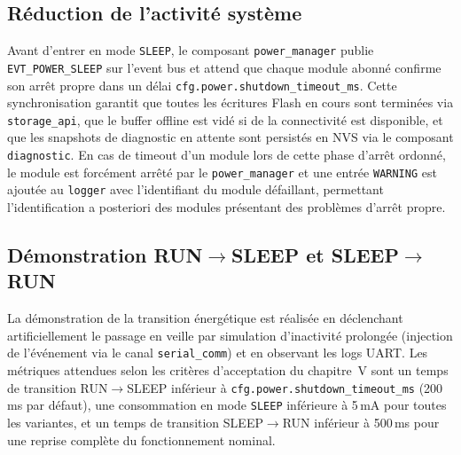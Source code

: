 \subsection{Réduction de l'activité système}
\label{subsec:power_reduce}

Avant d'entrer en mode \texttt{SLEEP}, le composant \texttt{power\_manager}
publie \texttt{EVT\_POWER\_SLEEP} sur l'event bus et attend que chaque
module abonné confirme son arrêt propre dans un délai
\texttt{cfg.power.shutdown\_timeout\_ms}. Cette synchronisation
garantit que toutes les écritures Flash en cours sont terminées via
\texttt{storage\_api}, que le buffer offline est vidé si de la
connectivité est disponible, et que les snapshots de diagnostic en
attente sont persistés en NVS via le composant \texttt{diagnostic}.
En cas de timeout d'un module lors de cette phase d'arrêt ordonné,
le module est forcément arrêté par le \texttt{power\_manager} et une
entrée \texttt{WARNING} est ajoutée au \texttt{logger} avec l'identifiant
du module défaillant, permettant l'identification a posteriori des
modules présentant des problèmes d'arrêt propre.

\subsection{Démonstration RUN$\rightarrow$SLEEP et SLEEP$\rightarrow$RUN}
\label{subsec:power_demo}

La démonstration de la transition énergétique est réalisée en
déclenchant artificiellement le passage en veille par simulation
d'inactivité prolongée (injection de l'événement via le canal
\texttt{serial\_comm}) et en observant les logs UART. Les métriques
attendues selon les critères d'acceptation du chapitre~V sont un temps
de transition RUN$\rightarrow$SLEEP inférieur à
\texttt{cfg.power.shutdown\_timeout\_ms} (200\,ms par défaut), une
consommation en mode \texttt{SLEEP} inférieure à 5\,mA pour toutes
les variantes, et un temps de transition SLEEP$\rightarrow$RUN
inférieur à 500\,ms pour une reprise complète du fonctionnement nominal.



